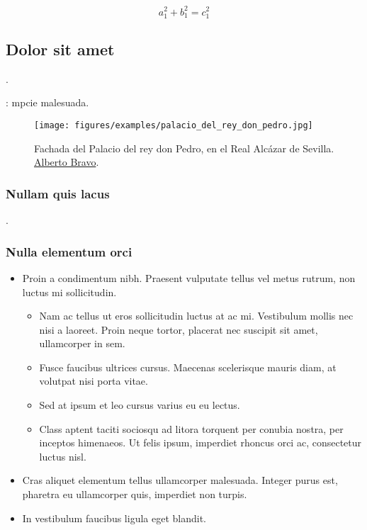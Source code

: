 \begin{equation}
        a_1^2 + b_1^2 = c_1^2
\end{equation}

\subsection{Dolor sit amet}

\lipsum[14]. 

\lipsum[15]:  \glsdesc{mpcie} malesuada. 

\lipsum[16]

\begin{figure}
    \centering
    \texttt{[image: figures/examples/palacio\_del\_rey\_don\_pedro.jpg]}
    \caption[Fachada del Palacio del rey don Pedro, en el Real Alcázar de Sevilla.]{Fachada del Palacio del rey don Pedro, en el Real Alcázar de Sevilla. \href{https://commons.wikimedia.org/wiki/File:Fachada_del_Palacio_del_rey_don_Pedro.jpg}{Alberto Bravo}.}
    \label{fig:cha1:donpedro}
\end{figure}

\lipsum[17]

\subsubsection{Nullam quis lacus}

\lipsum[18-20] \cite{lora-hw-e539v03a}. 

\subsubsection{Nulla elementum orci}

\lipsum[21]

\begin{itemize}
    \item Proin a condimentum nibh. Praesent vulputate tellus vel metus rutrum, non luctus mi sollicitudin. 
    \begin{itemize}
        \item Nam ac tellus ut eros sollicitudin luctus at ac mi. Vestibulum mollis nec nisi a laoreet. Proin neque tortor, placerat nec suscipit sit amet, ullamcorper in sem.
        \item Fusce faucibus ultrices cursus. Maecenas scelerisque mauris diam, at volutpat nisi porta vitae. 
        \item Sed at ipsum et leo cursus varius eu eu lectus. 
        \item Class aptent taciti sociosqu ad litora torquent per conubia nostra, per inceptos himenaeos. Ut felis ipsum, imperdiet rhoncus orci ac, consectetur luctus nisl. 
    \end{itemize}
    \item Cras aliquet elementum tellus ullamcorper malesuada. Integer purus est, pharetra eu ullamcorper quis, imperdiet non turpis.
    \item In vestibulum faucibus ligula eget blandit. 
\end{itemize}


